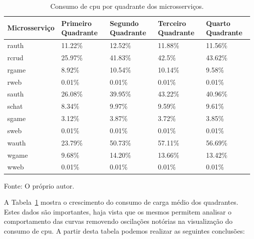 \begin{table}[htb!]
\centering
\begin{adjustbox}{max width=\textwidth}
\caption{Consumo de \ac{cpu} por quadrante dos microsserviços.}
\label{tab:cpu_microsservicos_media_quadrantes}

\begin{tabular}{|l|l|l|l|l|}
\hline
Microsserviço & Primeiro Quadrante & Segundo Quadrante & Terceiro Quadrante & Quarto Quadrante \\ \hline
rauth         & 11.22\%            & 12.52\%           & 11.88\%            & 11.56\%          \\ \hline
rcrud         & 25.97\%            & 41.83\%           & 42.5\%             & 43.62\%          \\ \hline
rgame         & 8.92\%             & 10.54\%           & 10.14\%            & 9.58\%           \\ \hline
rweb          & 0.01\%             & 0.01\%            & 0.01\%             & 0.01\%           \\ \hline
sauth         & 26.08\%            & 39.95\%           & 43.22\%            & 40.96\%          \\ \hline
schat         & 8.34\%             & 9.97\%            & 9.59\%             & 9.61\%           \\ \hline
sgame         & 3.12\%             & 3.87\%            & 3.72\%             & 3.85\%           \\ \hline
sweb          & 0.01\%             & 0.01\%            & 0.01\%             & 0.01\%           \\ \hline
wauth         & 23.79\%            & 50.73\%           & 57.11\%            & 56.69\%          \\ \hline
wgame         & 9.68\%             & 14.20\%           & 13.66\%            & 13.42\%          \\ \hline
wweb          & 0.01\%             & 0.01\%            & 0.01\%             & 0.01\%           \\ \hline
\end{tabular}
\end{adjustbox}

Fonte: O próprio autor.
\end{table}

A Tabela~\ref{tab:cpu_microsservicos_media_quadrantes} mostra o crescimento do consumo de carga médio dos quadrantes.
%
Estes dados são importantes, haja vista que os mesmos permitem analisar o comportamento das curvas removendo oscilações notórias na visualização do consumo de \ac{cpu}.
%
A partir desta tabela podemos realizar as seguintes conclusões:

